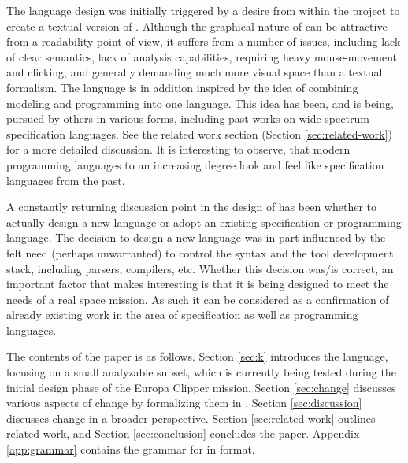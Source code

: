 The \Klang{} language design was initially triggered by a desire from within
the \ems{} project to create a textual version of \sysml. Although the graphical
nature of \sysml{} can be attractive from a readability point of view, it 
suffers from a number of issues, including lack of clear semantics, lack of analysis 
capabilities, requiring heavy mouse-movement and clicking, and generally demanding
much more visual space than a textual formalism. The \Klang{} language is in addition 
inspired by the idea of combining modeling and programming into one
language. This idea has been, and is being, pursued by others in various forms, including past works on wide-spectrum specification languages. See the
related work section (Section \ref{sec:related-work}) for a more detailed 
discussion. It is interesting to observe, that modern programming languages to an increasing degree look and feel like specification languages from the past. 

A constantly returning discussion point in the design of \Klang{} has been whether to 
actually design a new language or adopt an existing specification or programming 
language. The decision to design a new language was in part influenced by the felt 
need (perhaps unwarranted) to control the syntax and the tool development stack,
including parsers, compilers, etc. Whether this decision was/is correct, an important 
factor that makes \Klang{} interesting is that it is being designed 
to meet the needs of a real space mission. As such it can be considered as
a confirmation of already existing work in the area of specification as well as 
programming languages.

The contents of the paper is as follows. 
Section \ref{sec:k} introduces the \Klang{} language, focusing on a small
analyzable subset, which is currently being tested during the initial 
design phase of the Europa
Clipper mission.
Section \ref{sec:change} discusses various aspects of change by formalizing
them in \Klang.
Section \ref{sec:discussion} discusses change in a broader perspective.
Section \ref{sec:related-work} outlines related work, and 
Section \ref{sec:conclusion} concludes the paper.
Appendix \ref{app:grammar} contains the grammar for \Klang{} in \antlr{} 
\cite{antlr} format.
